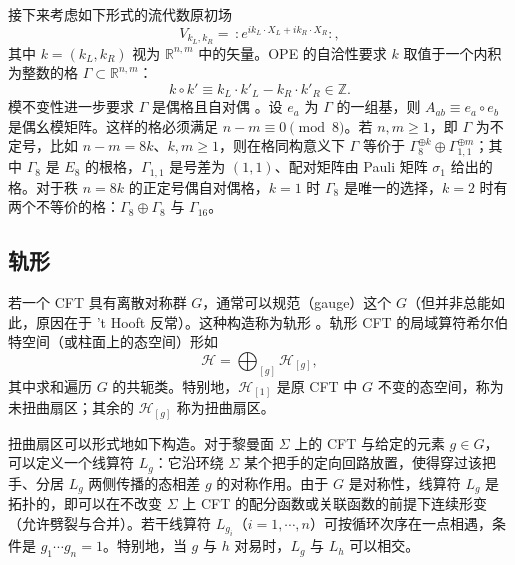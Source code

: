接下来考虑如下形式的流代数原初场
\begin{equation}
  \label{eq:4-3}
  V_{k_L,k_R}=\,:e^{ik_L\cdot X_L+ik_R\cdot X_R}:,
\end{equation}
其中 $k=(k_L,k_R)$ 视为 $\mathbb{R}^{n,m}$ 中的矢量。OPE 的自洽性要求 $k$ 取值于一个内积为整数的格 $\Gamma\subset\mathbb{R}^{n,m}$：
\begin{equation}
  \label{eq:4-4}
  k\circ k'\equiv k_L\cdot k'_L-k_R\cdot k'_R\in\mathbb{Z}.
\end{equation}
模不变性进一步要求 $\Gamma$ 是偶格且自对偶 \cite{r18}。设 $e_a$ 为 $\Gamma$ 的一组基，则 $A_{ab}\equiv e_a\circ e_b$ 是偶幺模矩阵。这样的格必须满足 $n-m\equiv0\pmod 8$。若 $n,m\ge1$，即 $\Gamma$ 为不定号，比如 $n-m=8k$、$k,m\ge1$，则在格同构意义下 $\Gamma$ 等价于 $\Gamma_8^{\oplus k}\oplus\Gamma_{1,1}^{\oplus m}$；其中 $\Gamma_8$ 是 $E_8$ 的根格，$\Gamma_{1,1}$ 是号差为 $(1,1)$、配对矩阵由 Pauli 矩阵 $\sigma_1$ 给出的格。对于秩 $n=8k$ 的正定号偶自对偶格，$k=1$ 时 $\Gamma_8$ 是唯一的选择，$k=2$ 时有两个不等价的格：$\Gamma_8\oplus\Gamma_8$ 与 $\Gamma_{16}$。


\subsection{轨形}\label{sec:4-2}

若一个 CFT 具有离散对称群 $G$，通常可以规范（gauge）这个 $G$（但并非总能如此，原因在于 't Hooft 反常）。这种构造称为轨形 \cite{r19}。轨形 CFT 的局域算符希尔伯特空间（或柱面上的态空间）形如
\begin{equation}
  \label{eq:4-5}
  \mathcal{H}=\bigoplus_{[g]}\mathcal{H}_{[g]},
\end{equation}
其中求和遍历 $G$ 的共轭类。特别地，$\mathcal{H}_{[1]}$ 是原 CFT 中 $G$ 不变的态空间，称为未扭曲扇区；其余的 $\mathcal{H}_{[g]}$ 称为扭曲扇区。

扭曲扇区可以形式地如下构造。对于黎曼面 $\Sigma$ 上的 CFT 与给定的元素 $g\in G$，可以定义一个线算符 $L_g$：它沿环绕 $\Sigma$ 某个把手的定向回路放置，使得穿过该把手、分居 $L_g$ 两侧传播的态相差 $g$ 的对称作用。由于 $G$ 是对称性，线算符 $L_g$ 是拓扑的，即可以在不改变 $\Sigma$ 上 CFT 的配分函数或关联函数的前提下连续形变（允许劈裂与合并）。若干线算符 $L_{g_i}$（$i=1,\cdots,n$）可按循环次序在一点相遇，条件是 $g_1\cdots g_n=1$。特别地，当 $g$ 与 $h$ 对易时，$L_g$ 与 $L_h$ 可以相交。

